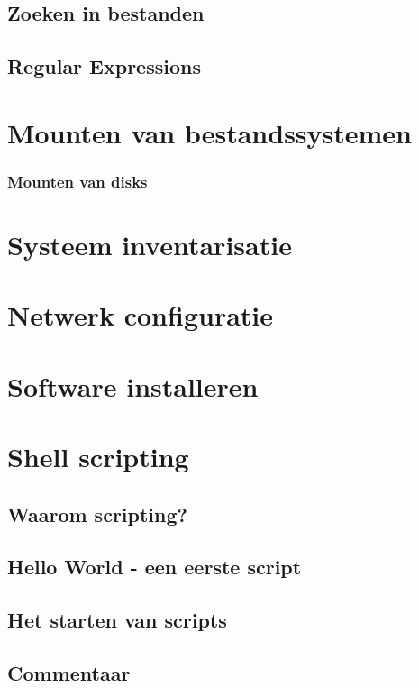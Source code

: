 \documentclass[a4paper,12pt,twoside,openright,titlepage]{book}
\begin{document}
\section{Zoeken in bestanden}
\section{Regular Expressions}

\chapter{Mounten van bestandssystemen}

\subsection{Mounten van disks}


\chapter{Systeem inventarisatie}

\chapter{Netwerk configuratie}

\chapter{Software installeren}

\chapter{Shell scripting}

\section{Waarom scripting?}

\section{Hello World - een eerste script}

\section{Het starten van scripts}

\section{Commentaar}

\end{document}
